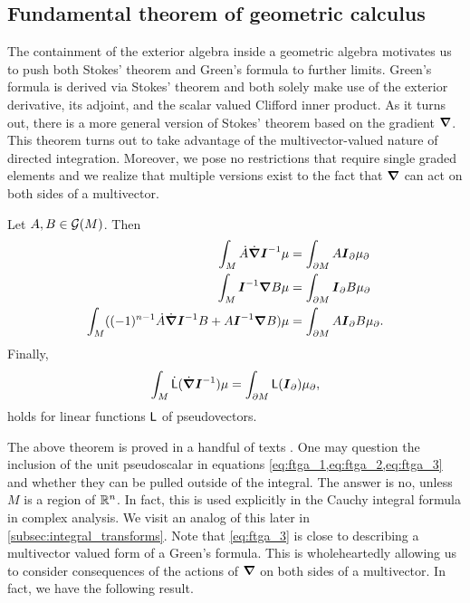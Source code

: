\subsection{Fundamental theorem of geometric calculus}
\label{subsec:ftgc}

The containment of the exterior algebra inside a geometric algebra motivates us to push both Stokes' theorem and Green's formula to further limits. Green's formula is derived via Stokes' theorem and both solely make use of the exterior derivative, its adjoint, and the scalar valued Clifford inner product. As it turns out, there is a more general version of Stokes' theorem based on the gradient $\boldsymbol{\nabla}$. This theorem turns out to take advantage of the multivector-valued nature of directed integration. Moreover, we pose no restrictions that require single graded elements and we realize that multiple versions exist to the fact that $\boldsymbol{\nabla}$ can act on both sides of a multivector.

\begin{theorem}
\label{thm:ftga}
Let $A,B\in \mathcal{G}(M)$. Then
\begin{align}
\label{eq:ftga_1}
\int_M \dot{A}\dot{\boldsymbol{\nabla}} \boldsymbol{I}^{-1} \mu &= \int_{\partial M}  A \boldsymbol{I}_\partial \mu_\partial\\
\label{eq:ftga_2}
\int_M  \boldsymbol{I}^{-1} \boldsymbol{\nabla} B \mu &= \int_{\partial M} \boldsymbol{I}_\partial B \mu_\partial\\
\label{eq:ftga_3}
\int_M ((-1)^{n-1} \dot{A}\dot{\boldsymbol{\nabla}} \boldsymbol{I}^{-1} B + A \boldsymbol{I}^{-1} \boldsymbol{\nabla} B)\mu &= \int_{\partial M} A \boldsymbol{I}_\partial B \mu_\partial.
\end{align}
Finally,
\begin{equation}
\label{eq:ftga_4}
\int_M \dot{\sf{L}}(\dot{\boldsymbol{\nabla}} \boldsymbol{I}^{-1})\mu = \int_{\partial M} \sf{L}(\boldsymbol{I}_\partial)\mu_\partial,
\end{equation}
holds for linear functions $\sf{L}$ of pseudovectors.
\end{theorem}
The above theorem is proved in a handful of texts . One may question the inclusion of the unit pseudoscalar in equations \cref{eq:ftga_1,eq:ftga_2,eq:ftga_3} and whether they can be pulled outside of the integral. The answer is no, unless $M$ is a region of $\mathbb{R}^n$. In fact, this is used explicitly in the Cauchy integral formula in complex analysis. We visit an analog of this later in \cref{subsec:integral_transforms}. Note that \cref{eq:ftga_3} is close to describing a multivector valued form of a Green's formula. This is wholeheartedly allowing us to consider consequences of the actions of $\boldsymbol{\nabla}$ on both sides of a multivector. In fact, we have the following result.

